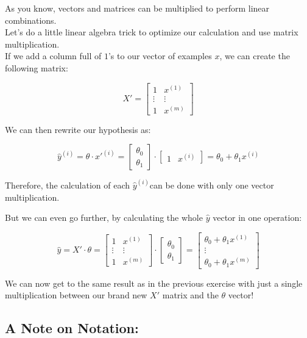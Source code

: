 \documentclass[]{article}
\begin{document}
As you know, vectors and matrices can be multiplied to perform linear
combinations.\\
Let's do a little linear algebra trick to optimize our calculation and
use matrix multiplication.\\
If we add a column full of \(1\)'s to our vector of examples \(x\), we
can create the following matrix:

\large

\[
X' = \begin{bmatrix} 1 & x^{(1)} \\ \vdots & \vdots \\ 1 & x^{(m)}\end{bmatrix}
\] \normalsize

We can then rewrite our hypothesis as:

\large

\[
\hat{y}^{(i)} = \theta \cdot x'^{(i)} = \begin{bmatrix}\theta_0 \\ \theta_1 \end{bmatrix}  \cdot \begin{bmatrix} 1 & x^{(i)} \end{bmatrix} = \theta_0 + \theta_1 x^{(i)}
\] \normalsize

Therefore, the calculation of each \(\hat{y}^{(i)}\)can be done with
only one vector multiplication.

But we can even go further, by calculating the whole \(\hat{y}\) vector
in one operation:

\large

\[
\hat{y} = X' \cdot \theta = \begin{bmatrix} 1 & x^{(1)} \\ \vdots & \vdots \\ 1 & x^{(m)}\end{bmatrix}\cdot\begin{bmatrix}\theta_0 \\ \theta_1 \end{bmatrix} = \begin{bmatrix} \theta_0 + \theta_1 x^{(1)} \\ \vdots \\ \theta_0 + \theta_1 x^{(m)} \end{bmatrix}
\] \normalsize

We can now get to the same result as in the previous exercise with just
a single multiplication between our brand new \(X'\) matrix and the
\(\theta\) vector!

\hypertarget{a-note-on-notation}{%
\subsection{A Note on Notation:}\label{a-note-on-notation}}
\end{document}
